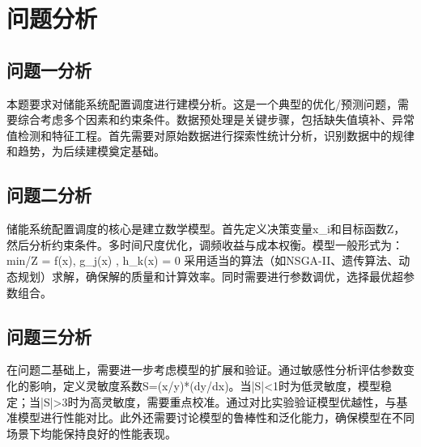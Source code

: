 \newpage
\section{问题分析}

\subsection{问题一分析}
本题要求对储能系统配置调度进行建模分析。这是一个典型的优化/预测问题，需要综合考虑多个因素和约束条件。数据预处理是关键步骤，包括缺失值填补、异常值检测和特征工程。首先需要对原始数据进行探索性统计分析，识别数据中的规律和趋势，为后续建模奠定基础。

\subsection{问题二分析}
储能系统配置调度的核心是建立数学模型。首先定义决策变量x_i和目标函数Z，然后分析约束条件。多时间尺度优化，调频收益与成本权衡。模型一般形式为：
\\min/\max \quad Z = f(x), \quad {} \quad g_j(x) , \; h_k(x) = 0
采用适当的算法（如NSGA-II、遗传算法、动态规划）求解，确保解的质量和计算效率。同时需要进行参数调优，选择最优超参数组合。

\subsection{问题三分析}
在问题二基础上，需要进一步考虑模型的扩展和验证。通过敏感性分析评估参数变化的影响，定义灵敏度系数S=(x/y)*(dy/dx)。当|S|<1时为低灵敏度，模型稳定；当|S|>3时为高灵敏度，需要重点校准。通过对比实验验证模型优越性，与基准模型进行性能对比。此外还需要讨论模型的鲁棒性和泛化能力，确保模型在不同场景下均能保持良好的性能表现。
